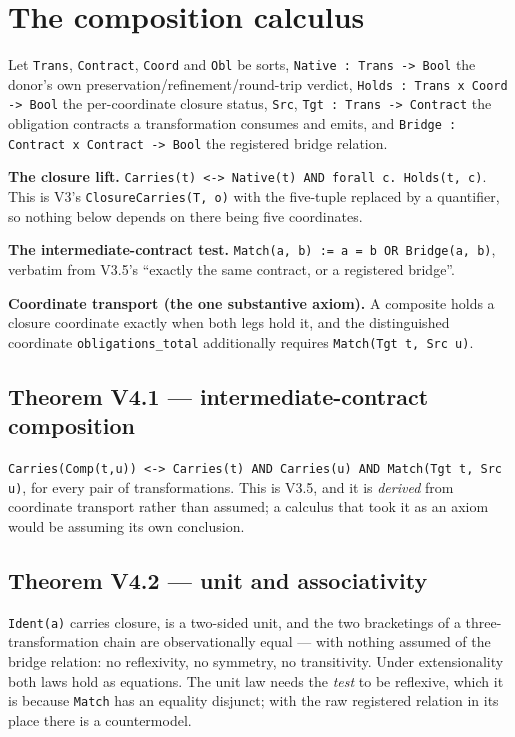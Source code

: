 \section{The composition calculus}

Let \texttt{Trans}, \texttt{Contract}, \texttt{Coord} and \texttt{Obl} be sorts,
\texttt{Native : Trans -> Bool} the
donor's own preservation/refinement/round-trip verdict,
\texttt{Holds : Trans x Coord -> Bool} the per-coordinate closure status,
\texttt{Src}, \texttt{Tgt : Trans -> Contract} the
obligation contracts a transformation consumes and emits, and
\texttt{Bridge : Contract x Contract -> Bool} the registered bridge relation.

\textbf{The closure lift.} \texttt{Carries(t) <-> Native(t) AND forall c. Holds(t, c)}. This
is V3's \texttt{ClosureCarries(T, o)} with the five-tuple replaced by a quantifier, so
nothing below depends on there being five coordinates.

\textbf{The intermediate-contract test.} \texttt{Match(a, b) := a = b OR Bridge(a, b)},
verbatim from V3.5's ``exactly the same contract, or a registered bridge''.

\textbf{Coordinate transport (the one substantive axiom).} A composite holds a closure
coordinate exactly when both legs hold it, and the distinguished coordinate
\texttt{obligations_total} additionally requires \texttt{Match(Tgt t, Src u)}.

\subsection{Theorem V4.1 --- intermediate-contract composition}

\texttt{Carries(Comp(t,u)) <-> Carries(t) AND Carries(u) AND Match(Tgt t, Src u)}, for
every pair of transformations. This is V3.5, and it is \emph{derived} from coordinate
transport rather than assumed; a calculus that took it as an axiom would be
assuming its own conclusion.

\subsection{Theorem V4.2 --- unit and associativity}

\texttt{Ident(a)} carries closure, is a two-sided unit, and the two bracketings of a
three-transformation chain are observationally equal --- with nothing assumed of
the bridge relation: no reflexivity, no symmetry, no transitivity. Under
extensionality both laws hold as equations. The unit law needs the \emph{test} to be
reflexive, which it is because \texttt{Match} has an equality disjunct; with the raw
registered relation in its place there is a countermodel.

